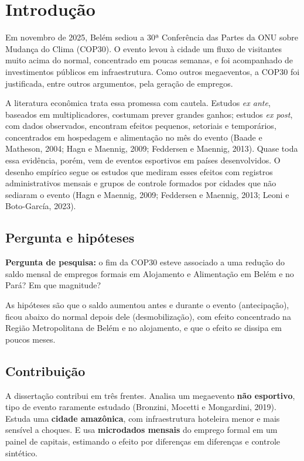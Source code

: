 \chapter{Introdução}\label{cap:introducao}

Em novembro de 2025, Belém sediou a 30ª Conferência das Partes da ONU sobre Mudança do Clima (COP30).
O evento levou à cidade um fluxo de visitantes muito acima do normal, concentrado em poucas semanas, e
foi acompanhado de investimentos públicos em infraestrutura. Como outros megaeventos, a COP30 foi
justificada, entre outros argumentos, pela geração de empregos.

A literatura econômica trata essa promessa com cautela. Estudos \textit{ex ante}, baseados em
multiplicadores, costumam prever grandes ganhos; estudos \textit{ex post}, com dados observados,
encontram efeitos pequenos, setoriais e temporários, concentrados em hospedagem e alimentação no mês do
evento (Baade e Matheson, 2004; Hagn e Maennig, 2009; Feddersen e Maennig, 2013). Quase toda essa
evidência, porém, vem de eventos esportivos em países desenvolvidos. O desenho empírico segue os estudos que
mediram esses efeitos com registros administrativos mensais e grupos de controle formados por cidades
que não sediaram o evento (Hagn e Maennig, 2009; Feddersen e Maennig, 2013; Leoni e Boto-García, 2023).

\section{Pergunta e hipóteses}

\textbf{Pergunta de pesquisa:} o fim da COP30 esteve associado a uma redução do saldo mensal de empregos
formais em Alojamento e Alimentação em Belém e no Pará? Em que magnitude?

As hipóteses são que o saldo aumentou antes e durante o evento (antecipação), ficou abaixo do normal
depois dele (desmobilização), com efeito concentrado na Região Metropolitana de Belém e no alojamento, e
que o efeito se dissipa em poucos meses.

\section{Contribuição}

A dissertação contribui em três frentes. Analisa um megaevento \textbf{não esportivo}, tipo de evento
raramente estudado (Bronzini, Mocetti e Mongardini, 2019). Estuda uma \textbf{cidade amazônica}, com
infraestrutura hoteleira menor e mais sensível a choques. E usa \textbf{microdados mensais} do emprego
formal em um painel de capitais, estimando o efeito por diferenças em diferenças e controle sintético.

